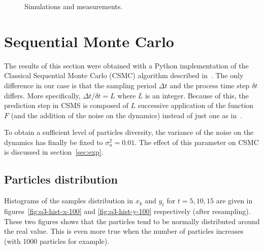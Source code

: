 \documentclass[english, DIV=13]{scrartcl}
\begin{document}
\begin{figure}[hb]
    \caption{Simulations and measurements.}
\end{figure}

\FloatBarrier

\section{Sequential Monte Carlo}
The results of this section were obtained with a Python implementation of the Classical
Sequential Monte Carlo (CSMC) algorithm described in~\cite{anuj}. The only difference
in our case is that the sampling period $\Delta t$ and the process time step $\delta t$
differs. More specifically, $\Delta t/\delta t = L$ where $L$ is an integer. Because
of this, the prediction step in CSMS is composed of $L$ successive application of the
function $F$ (and the addition of the noise on the dynamics) instead of just one as
in~\cite{anuj}.

To obtain a sufficient level of particles diversity, the variance of the noise on the
dynamics has finally be fixed to $\sigma^2_u = 0.01$. The effect of this parameter on
CSMC is discussed in section~\ref{sec:exp}.

\subsection{Particles distribution}
\label{sec:particles-distri}
Histograms of the samples distribution in $x_k$ and $y_t$ for $t = 5, 10, 15$ are
given in figures~\ref{fig:q3-hist-x-100} and \ref{fig:q3-hist-y-100} respectively
(after resampling). These two figures shows that the particles tend to be normally
distributed around the real value. This is even more true when the number of particles
increases (with 1000 particles for example).
\end{document}
